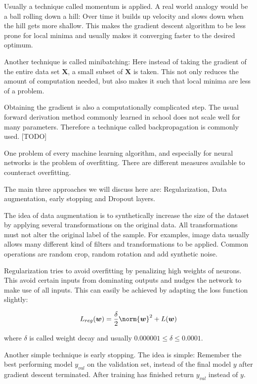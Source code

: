 \documentclass[draft,final,oneside]{vutinfth} %
\begin{document}
Usually a technique called momentum is applied. A real world analogy would be a ball rolling down a hill: Over time it builds up velocity and slows down when the hill gets more shallow. This makes the gradient descent algorithm to be less prone for local minima and usually makes it converging faster to the desired optimum.

Another technique is called minibatching: Here instead of taking the gradient of the entire data set $\boldsymbol{X}$, a small subset of $\boldsymbol{X}$ is taken. This not only reduces the amount of computation needed, but also makes it such that local minima are less of a problem.

Obtaining the gradient is also a computationally complicated step. The usual forward derivation method commonly learned in school does not scale well for many parameters. Therefore a technique called backpropagation is commonly used. [TODO]

One problem of every machine learning algorithm, and especially for neural networks is the problem of overfitting. There are different measures available to counteract overfitting.

The main three approaches we will discuss here are: Regularization, Data augmentation, early stopping and Dropout layers. 

The idea of data augmentation is to synthetically increase the size of the dataset by applying several transformations on the original data. All transformations must not alter the original label of the sample. For examples, image data usually allows many different kind of filters and transformations to be applied. Common operations are random crop, random rotation and add synthetic noise.

Regularization tries to avoid overfitting by penalizing	high weights of neurons. This avoid certain inputs from dominating outputs and nudges the network to make use of all inputs. This can easily be achieved by adapting the loss function slightly:

\begin{equation}
L_{reg}(\boldsymbol{w}) = \dfrac{\delta}{2}\norm{\boldsymbol{w}}^2 + L(\boldsymbol{w})
\end{equation}

where $\delta$ is called weight decay and usually $0.000001 \leq \delta \leq 0.0001$.

Another simple technique is early stopping. The idea is simple: Remember the best performing model $y_{val}$ on the validation set, instead of the final model $y$ after gradient descent terminated. After training has finished return $y_{val}$ instead of $y$.
\end{document}
